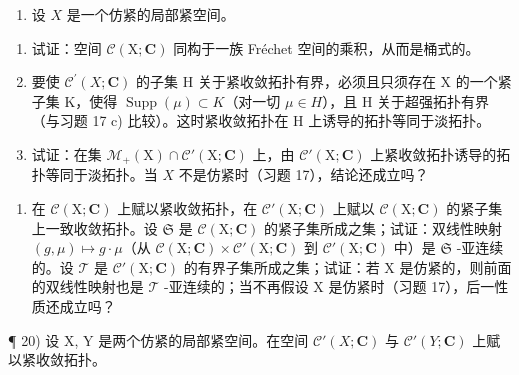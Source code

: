\begin{enumerate}
\def\labelenumi{\arabic{enumi})}
\setcounter{enumi}{17}
\tightlist
\item
  设 \(X\) 是一个仿紧的局部紧空间。
\end{enumerate}

\begin{enumerate}
\def\labelenumi{\alph{enumi})}
\item
  试证：空间 \(\mathcal{C}(\mathrm{X};\mathbf{C})\) 同构于一族 Fréchet 空间的乘积，从而是桶式的。
\item
  要使 \(\mathcal{C}^{\prime}(X; \mathbf{C})\) 的子集 H 关于紧收敛拓扑有界，必须且只须存在 X 的一个紧子集 K，使得 \(\operatorname{Supp}(\mu) \subset K\)（对一切 \(\mu \in H\)），且 H 关于超强拓扑有界（与习题 17 c) 比较）。这时紧收敛拓扑在 H 上诱导的拓扑等同于淡拓扑。
\item
  试证：在集 \(\mathcal{M}_{+}(\mathrm{X})\cap \mathcal{C}'(\mathrm{X};\mathbf{C})\) 上，由 \(\mathcal{C}'(\mathrm{X};\mathbf{C})\) 上紧收敛拓扑诱导的拓扑等同于淡拓扑。当 \(X\) 不是仿紧时（习题 17），结论还成立吗？
\end{enumerate}

\begin{enumerate}
\def\labelenumi{\arabic{enumi})}
\setcounter{enumi}{18}
\tightlist
\item
  在 \(\mathcal{C}(\mathrm{X};\mathbf{C})\) 上赋以紧收敛拓扑，在 \(\mathcal{C}'(\mathrm{X};\mathbf{C})\) 上赋以 \(\mathcal{C}(\mathrm{X};\mathbf{C})\) 的紧子集上一致收敛拓扑。设 \(\mathfrak{S}\) 是 \(\mathcal{C}(\mathrm{X};\mathbf{C})\) 的紧子集所成之集；试证：双线性映射 \((g,\mu)\mapsto g\cdot \mu\)（从 \(\mathcal{C}(\mathrm{X};\mathbf{C})\times \mathcal{C}'(\mathrm{X};\mathbf{C})\) 到 \(\mathcal{C}'(\mathrm{X};\mathbf{C})\) 中）是 \(\mathfrak{S}\) -亚连续的。设 \(\mathcal{T}\) 是 \(\mathcal{C}'(\mathrm{X};\mathbf{C})\) 的有界子集所成之集；试证：若 X 是仿紧的，则前面的双线性映射也是 \(\mathcal{T}\) -亚连续的；当不再假设 X 是仿紧时（习题 17），后一性质还成立吗？
\end{enumerate}

¶ 20) 设 X, Y 是两个仿紧的局部紧空间。在空间 \(\mathcal{C}'(X; \mathbf{C})\) 与 \(\mathcal{C}'(Y; \mathbf{C})\) 上赋以紧收敛拓扑。

